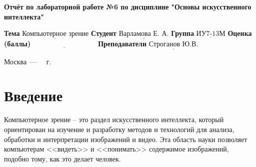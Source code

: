 \documentclass[12pt]{report}
\begin{document}
\begin{titlepage}
	
	\begin{center}
		\noindent\begin{minipage}{1.3\textwidth}\centering
			\Large\textbf{  Отчёт по лабораторной работе №6 по дисциплине}\newline
			\textbf{ "Основы искусственного интеллекта"}\newline\newline
		\end{minipage}
	\end{center}
	
	\noindent\textbf{Тема} $\underline{\text{Компьютерное зрение}}$\newline\newline
	\noindent\textbf{Студент} $\underline{\text{Варламова Е. А.}}$\newline\newline
	\noindent\textbf{Группа} $\underline{\text{ИУ7-13М}}$\newline\newline
	\noindent\textbf{Оценка (баллы)} $\underline{\text{~~~~~~~~~~~~~~~~~~~~~~~~~~~}}$\newline\newline
	\noindent\textbf{Преподаватели} $\underline{\text{Строганов Ю.В.}}$\newline\newline\newline
	
	\begin{center}
		\vfill
		Москва~---~\the\year
		~г.
	\end{center}
\end{titlepage}
\large
\setcounter{page}{2}
\def\contentsname{СОДЕРЖАНИЕ}
\renewcommand{\contentsname}{СОДЕРЖАНИЕ}
\tableofcontents
\renewcommand\labelitemi{---}
\newpage
\chapter*{Введение}

Компьютерное зрение -- это раздел искусственного интеллекта, который ориентирован на изучение и разработку методов и технологий для анализа, обработки и интерпретации изображений и видео. Эта область науки позволяет компьютерам <<видеть>> и <<понимать>> содержимое изображений, подобно тому, как это делает человек.
\end{document}
